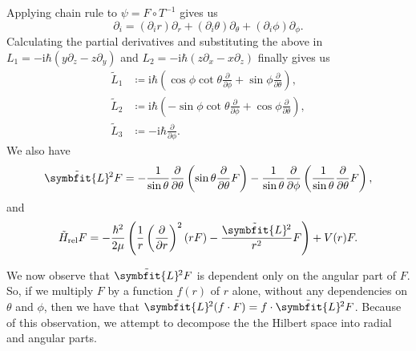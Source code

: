 \documentclass[12pt, a4 paper]{article}
\theoremstyle{definition}
\renewcommand{\i}{\mathrm{i}}
\newcommand{\angsone}{\tilde{L}_1}
\newcommand{\angstwo}{\tilde{L}_2}
\newcommand{\angsthree}{\tilde{L}_3}
\newcommand{\lvecsquare}{\tilde{\symbfit{L}}\kern-1pt^2}
\begin{document}
	Applying chain rule to $\psi = F \circ T^{-1}$ gives us
	\[
	    \partial_i = (\partial_i r)\partial_r + (\partial_i \theta)\partial_\theta + (\partial_i \phi)\partial_\phi.
	\]
	Calculating the partial derivatives and substituting the above in $L_1 = -\i\hbar(y\partial_z - z\partial_y)$ and $L_2 = -\i\hbar(z\partial_x - x\partial_z)$ finally gives us
	\begin{align*}
		\angsone &\coloneq \i\hbar\left(\cos{\phi}\cot{\theta}\frac{\partial}{\partial\phi} + \sin{\phi}\frac{\partial}{\partial\theta}\right),\\
		\angstwo &\coloneq \i\hbar\left(-\sin{\phi}\cot{\theta}\frac{\partial}{\partial\phi} + \cos{\phi}\frac{\partial}{\partial\theta}\right),\\
		\angsthree &\coloneq -\i\hbar \frac{\partial}{\partial\phi}.
	\end{align*}
	We also have
	\[
		\lvecsquare F = -\frac{1}{\sin{\theta}}\frac{\partial}{\partial \theta}\left(\sin{\theta}\frac{\partial}{\partial\theta}F\right) -\frac{1}{\sin{\theta}}\frac{\partial}{\partial\phi}\left(\frac{1}{\sin{\theta}}\frac{\partial}{\partial\theta}F\right),
	\]
	and
	\[
		\tilde{H}_\text{rel} F = -\frac{\hbar^2}{2\mu}\left(\frac{1}{r}\left(\frac{\partial}{\partial r}\right)^2 (rF) - \frac{\lvecsquare}{r^2}F\right) + V(r)F.
	\]

	We now observe that $\lvecsquare F$ is dependent only on the angular part of $F$. So, if we multiply $F$ by a function $f(r)$ of $r$ alone, without any dependencies on $\theta$ and $\phi$, then we have that $\lvecsquare(f\cdot F) = f \cdot \lvecsquare F$. Because of this observation, we attempt to decompose the the Hilbert space into radial and angular parts.
\end{document}
